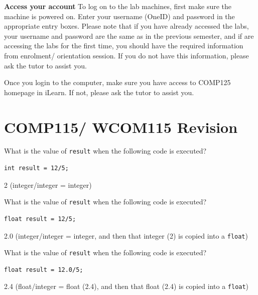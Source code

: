 \vspace{1em}
\begin{questions}
\question  \textbf{Access your account} \vskip 0.5cm
To log on to the lab machines, first make sure the machine is powered on. 
Enter your username (OneID) and password in the appropriate entry boxes. 
Please note that if you have already accessed the labs, your username and password are the same as in the previous semester, and if are accessing the labs for the first time, you should have the required information from enrolment/ orientation session. If you do not have this information, please ask the tutor to assist you.

Once you login to the computer, make sure you have access to COMP125 homepage in iLearn. If not, please ask the tutor to assist you.

\newpage

\section*{COMP115/ WCOM115 Revision}

\question What is the value of \texttt{result} when the following code is executed?
\begin{lstlisting}
int result = 12/5;
\end{lstlisting}

\begin{solution}
2 (integer/integer = integer)
\end{solution}

\question What is the value of \texttt{result} when the following code is executed?
\begin{lstlisting}
float result = 12/5;
\end{lstlisting}

\begin{solution}
2.0 (integer/integer = integer, and then that integer (2) is copied into a \texttt{float})
\end{solution}

\question What is the value of \texttt{result} when the following code is executed?
\begin{lstlisting}
float result = 12.0/5;
\end{lstlisting}

\begin{solution}
2.4 (float/integer = float (2.4), and then that float (2.4) is copied into a \texttt{float})
\end{solution}


\end{questions}
